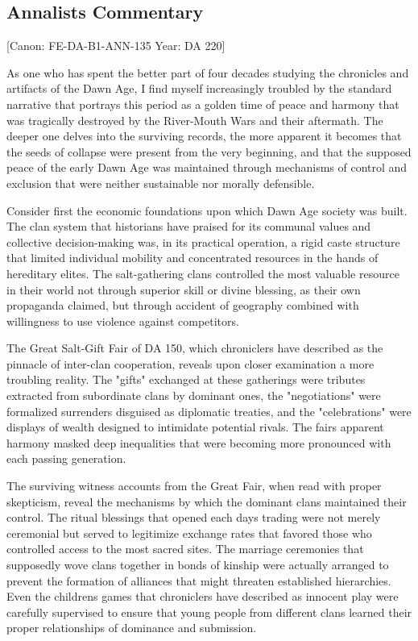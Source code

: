 \subsection{Annalist\textquotesingle s
Commentary}\label{annalists-commentary}

{[}Canon: FE-DA-B1-ANN-135 \textbar{} Year: DA 220{]}

As one who has spent the better part of four decades studying the
chronicles and artifacts of the Dawn Age, I find myself increasingly
troubled by the standard narrative that portrays this period as a golden
time of peace and harmony that was tragically destroyed by the
River-Mouth Wars and their aftermath. The deeper one delves into the
surviving records, the more apparent it becomes that the seeds of
collapse were present from the very beginning, and that the supposed
peace of the early Dawn Age was maintained through mechanisms of control
and exclusion that were neither sustainable nor morally defensible.

Consider first the economic foundations upon which Dawn Age society was
built. The clan system that historians have praised for its communal
values and collective decision-making was, in its practical operation, a
rigid caste structure that limited individual mobility and concentrated
resources in the hands of hereditary elites. The salt-gathering clans
controlled the most valuable resource in their world not through
superior skill or divine blessing, as their own propaganda claimed, but
through accident of geography combined with willingness to use violence
against competitors.

The Great Salt-Gift Fair of DA 150, which chroniclers have described as
the pinnacle of inter-clan cooperation, reveals upon closer examination
a more troubling reality. The "gifts" exchanged at these gatherings were
tributes extracted from subordinate clans by dominant ones, the
"negotiations" were formalized surrenders disguised as diplomatic
treaties, and the "celebrations" were displays of wealth designed to
intimidate potential rivals. The fair\textquotesingle s apparent harmony
masked deep inequalities that were becoming more pronounced with each
passing generation.

The surviving witness accounts from the Great Fair, when read with
proper skepticism, reveal the mechanisms by which the dominant clans
maintained their control. The ritual blessings that opened each
day\textquotesingle s trading were not merely ceremonial but served to
legitimize exchange rates that favored those who controlled access to
the most sacred sites. The marriage ceremonies that supposedly wove
clans together in bonds of kinship were actually arranged to prevent the
formation of alliances that might threaten established hierarchies. Even
the children\textquotesingle s games that chroniclers have described as
innocent play were carefully supervised to ensure that young people from
different clans learned their proper relationships of dominance and
submission.


